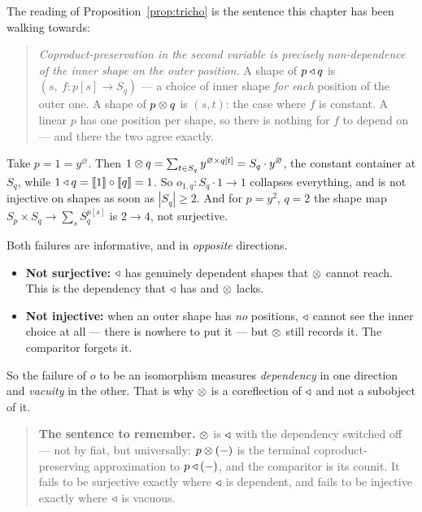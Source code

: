 The reading of Proposition~\ref{prop:tricho} is the sentence this chapter has
been walking towards:

\begin{quote}
\emph{Coproduct-preservation in the second variable is precisely non-dependence
of the inner shape on the outer position.} A shape of $p\mathbin{\triangleleft} q$ is
$(s,\ f\colon p[s]\to S_q)$ --- a choice of inner shape \emph{for each} position
of the outer one. A shape of $p\mathbin{\otimes} q$ is $(s,t)$: the case where $f$ is
constant. A linear $p$ has one position per shape, so there is nothing for $f$
to depend on --- and there the two agree exactly.
\end{quote}

\begin{Proposition}\label{prop:notmonoepi}
Take $p=1=y^{\varnothing}$. Then $1\mathbin{\otimes} q=\sum_{t\in S_q}y^{\varnothing\times
q[t]}=S_q\cdot y^{\varnothing}$, the constant container at $S_q$, while
$1\mathbin{\triangleleft} q=\llbracket 1 \rrbracket\circ\llbracket q \rrbracket=1$. So $o_{1,q}\colon S_q\cdot 1\to 1$ collapses
everything, and is not injective on shapes as soon as $|S_q|\ge2$. And for
$p=y^2$, $q=2$ the shape map $S_p\times S_q\to\sum_s S_q^{p[s]}$ is
$2\to 4$, not surjective.
\end{Proposition}

Both failures are informative, and in \emph{opposite} directions.

\begin{itemize}
\item \textbf{Not surjective:} $\mathbin{\triangleleft}$ has genuinely dependent shapes that $\mathbin{\otimes}$
  cannot reach. This is the dependency that $\mathbin{\triangleleft}$ has and $\mathbin{\otimes}$ lacks.
\item \textbf{Not injective:} when an outer shape has \emph{no} positions, $\mathbin{\triangleleft}$
  cannot see the inner choice at all --- there is nowhere to put it --- but $\mathbin{\otimes}$
  still records it. The comparitor forgets it.
\end{itemize}

So the failure of $o$ to be an isomorphism measures \emph{dependency} in one
direction and \emph{vacuity} in the other. That is why $\mathbin{\otimes}$ is a coreflection
of $\mathbin{\triangleleft}$ and not a subobject of it.

\begin{quote}
\textbf{The sentence to remember.} $\mathbin{\otimes}$ is $\mathbin{\triangleleft}$ with the dependency switched
off --- not by fiat, but universally: $p\mathbin{\otimes}(-)$ is the terminal
coproduct-preserving approximation to $p\mathbin{\triangleleft}(-)$, and the comparitor is its
counit. It fails to be surjective exactly where $\mathbin{\triangleleft}$ is dependent, and fails to
be injective exactly where $\mathbin{\triangleleft}$ is vacuous.
\end{quote}

